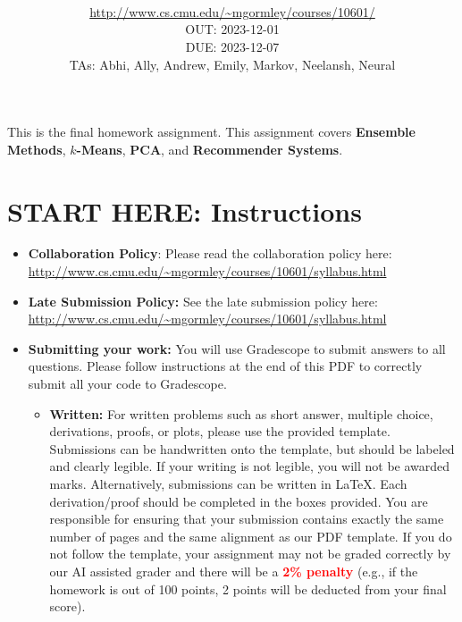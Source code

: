 \documentclass[11pt,addpoints,answers]{exam}
\title{\textsc{\hwName}
} %
\author{\courseName\\
\url{http://www.cs.cmu.edu/~mgormley/courses/10601/} \\
OUT:  2023-12-01 \\
DUE:  2023-12-07 \\
TAs: Abhi, Ally, Andrew, Emily, Markov, Neelansh, Neural
}
\date{}
\date{}
\newcommand{\homeworktype}{\string written}
\begin{document}
\maketitle

\begin{notebox}
This is the final homework assignment. This assignment covers \textbf{Ensemble Methods}, \textbf{$k$-Means}, \textbf{PCA}, and \textbf{Recommender Systems}.
\end{notebox}
\section*{START HERE: Instructions}
\begin{itemize}
\newcommand \maxsubs {10 }

\item \textbf{Collaboration Policy}: Please read the collaboration policy here: \url{http://www.cs.cmu.edu/~mgormley/courses/10601/syllabus.html}

\item\textbf{Late Submission Policy:} See the late submission policy here: \url{http://www.cs.cmu.edu/~mgormley/courses/10601/syllabus.html}

\item\textbf{Submitting your work:} You will use Gradescope to submit
  answers to all questions\ifthenelse{\equal{\homeworktype}{\string written}}{}{ and code}. Please
  follow instructions at the end of this PDF to correctly submit all your code to Gradescope.

\begin{itemize}
    
    \item \textbf{Written:} For written problems such as short answer, multiple choice, derivations, proofs, or plots, please use the provided template. Submissions can be handwritten onto the template, but should be labeled and clearly legible. If your writing is not legible, you will not be awarded marks. Alternatively, submissions can be written in \LaTeX{}. Each derivation/proof should be completed in the boxes provided. You are responsible for ensuring that your submission contains exactly the same number of pages and the same alignment as our PDF template. If you do not follow the template, your assignment may not be graded correctly by our AI assisted grader and there will be a \textbf{\textcolor{red}{2\% penalty}} (e.g., if the homework is out of 100 points, 2 points will be deducted from your final score).


\end{itemize}
\end{itemize}
\end{document}
